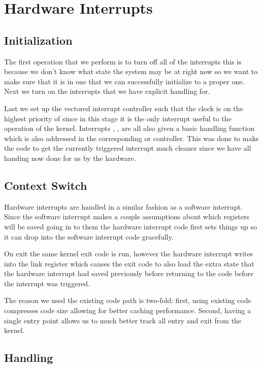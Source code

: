 \documentclass[pdftex,10pt,a4paper]{article}
\begin{document}
\newpage
\section*{Hardware Interrupts}

\subsection*{Initialization}

The first operation that we perform is to turn off all of the interrupts 
this is because we don't know what state the system may be at right now so we
want to make sure that it is in one that we can successfully initialize to a
proper one. Next we turn on the interrupts that we have explicit handling for.

Last we set up the vectored interrupt controller such that the clock is on the
highest priority of  since in this stage it is the only interrupt useful to
the operation of the kernel. Interrupts , ,  are all also given
a basic handling function which is also addressed in the corresponding  or 
 controller. This was done to make the code to get the currently triggered
interrupt much cleaner since we have all handing now done for us by the hardware.

\subsection*{Context Switch}

Hardware interrupts are handled in a similar fashion as a software interrupt.
Since the software interrupt makes a couple assumptions about which registers
will be saved going in to them the hardware interrupt code first sets things up
so it can drop into the software interrupt code gracefully.

On exit the same kernel exit code is run, however the hardware interrupt writes
 into the link register which causes the exit code to also load the extra
state that the hardware interrupt had saved previously before returning to the
code before the interrupt was triggered. 

The reason we used the existing code path is two-fold: first, using existing
code compresses code size allowing for better caching performance. Second,
having a single entry point allows us to much better track all entry and exit
from the kernel.

\subsection*{Handling}
\end{document}
